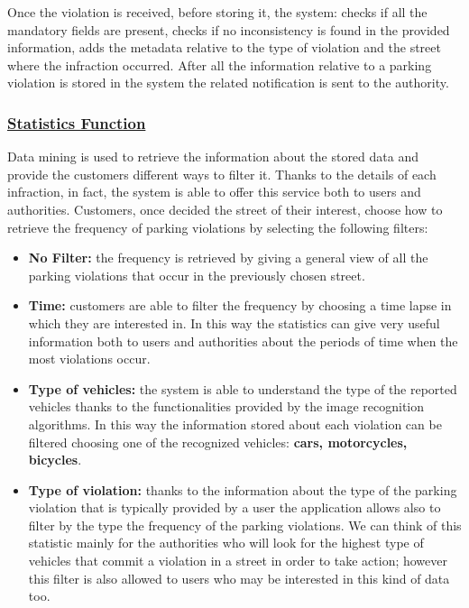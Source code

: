 		Once the violation is received, before storing it, the system: checks if all the mandatory fields are present, checks if no inconsistency is found in the provided information, adds the metadata relative to the type of violation and the street where the infraction occurred. After all the information relative to a parking violation is stored in the system the related notification is sent to the authority. %
		
	\subsubsection[Statistics Function]{\hyperlink{toc}{Statistics Function}}
		Data mining is used to retrieve the information about the stored data and provide the customers different ways to filter it. Thanks to the details of each infraction, in fact, the system is able to offer this service both to users and authorities. Customers, once decided the street of their interest, choose how to retrieve the frequency of parking violations by selecting the following filters:
			
		\begin{itemize}
			\item \textbf{No Filter:} the frequency is retrieved by giving a general view of all the parking violations that occur in the previously chosen street.
			
			\item \textbf{Time:} customers are able to filter the frequency by choosing a time lapse in which they are interested in. In this way the statistics can give very useful information both to users and authorities about the periods of time when the most violations occur.
			
			\item \textbf{Type of vehicles:} the system is able to understand the type of the reported vehicles thanks to the functionalities provided by the image recognition algorithms. In this way the information stored about each violation can be filtered choosing one of the recognized vehicles: \textbf{cars, motorcycles, bicycles}.
			
			\item \textbf{Type of violation:} thanks to the information about the type of the parking violation that is typically provided by a user the application allows also to filter by the type the frequency of the parking violations. We can think of this statistic mainly for the authorities who will look for the highest type of vehicles that commit a violation in a street in order to take action; however this filter is also allowed to users who may be interested in this kind of data too.
		\end{itemize}
	
